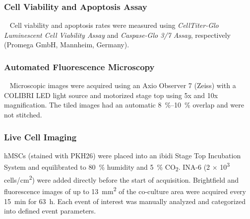 \subsubsection*{Cell Viability and Apoptosis Assay}
\ %
Cell viability and apoptosis rates were measured using \textit{CellTiter-Glo Luminescent
Cell Viability Assay} and \textit{Caspase-Glo 3/7 Assay}, respectively (Promega GmbH,
Mannheim, Germany).



\subsubsection*{Automated Fluorescence Microscopy}
\ %
Microscopic images were acquired using an Axio Observer 7 (Zeiss) with a COLIBRI LED
light source and motorized stage top using 5x and 10x magnification. The tiled images had
an automatic \SIrange{8}{10}{\percent} overlap and were not stitched.



\subsubsection*{Live Cell Imaging}
hMSCs (stained with PKH26) were placed into an ibidi Stage Top Incubation System
and equilibrated to \SI{80}{\percent} humidity and \SI{5}{\percent}
CO\textsubscript{2}. INA-6 (2 $\times$ 10\textsuperscript{3}
cells/cm\textsuperscript{2}) were added directly before the start of
acquisition. Brightfield and fluorescence images of up to \SI{13}{\mm\squared}
of the co-culture area were acquired every \SI{15}{\minute} for \SI{63}{\hour}.
Each event of interest was manually analyzed and categorized into defined event
parameters.




